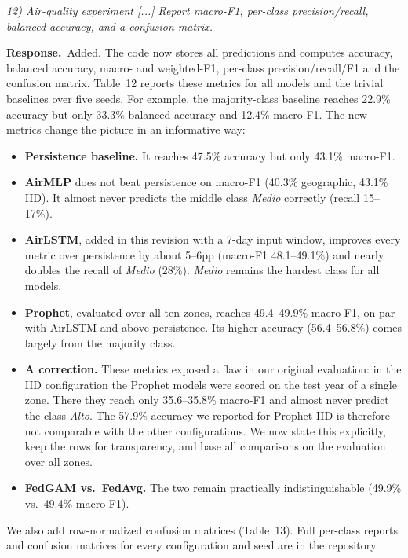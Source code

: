 \documentclass[11pt,a4paper]{article}
\newenvironment{comment}{\par\medskip\noindent\begin{minipage}{\linewidth}\color{blue!45!black}\itshape}{\end{minipage}\par}
\newcommand{\reply}{\par\smallskip\noindent\textbf{Response.}~}
\begin{document}
\begin{comment}
12) Air-quality experiment [...] Report macro-F1, per-class precision/recall, balanced accuracy, and a confusion matrix.
\end{comment}
\reply Added. The code now stores all predictions and computes accuracy, balanced accuracy, macro- and weighted-F1, per-class precision/recall/F1 and the confusion matrix. Table~12 reports these metrics for all models and the trivial baselines over five seeds. For example, the majority-class baseline reaches 22.9\% accuracy but only 33.3\% balanced accuracy and 12.4\% macro-F1. The new metrics change the picture in an informative way:
\begin{itemize}[leftmargin=1.3em,itemsep=0.1em]
\item \textbf{Persistence baseline.} It reaches 47.5\% accuracy but only 43.1\% macro-F1.
\item \textbf{AirMLP} does not beat persistence on macro-F1 (40.3\% geographic, 43.1\% IID). It almost never predicts the middle class \textit{Medio} correctly (recall 15--17\%).
\item \textbf{AirLSTM}, added in this revision with a 7-day input window, improves every metric over persistence by about 5--6pp (macro-F1 48.1--49.1\%) and nearly doubles the recall of \textit{Medio} (28\%). \textit{Medio} remains the hardest class for all models.
\item \textbf{Prophet}, evaluated over all ten zones, reaches 49.4--49.9\% macro-F1, on par with AirLSTM and above persistence. Its higher accuracy (56.4--56.8\%) comes largely from the majority class.
\item \textbf{A correction.} These metrics exposed a flaw in our original evaluation: in the IID configuration the Prophet models were scored on the test year of a single zone. There they reach only 35.6--35.8\% macro-F1 and almost never predict the class \textit{Alto}. The 57.9\% accuracy we reported for Prophet-IID is therefore not comparable with the other configurations. We now state this explicitly, keep the rows for transparency, and base all comparisons on the evaluation over all zones.
\item \textbf{FedGAM vs.\ FedAvg.} The two remain practically indistinguishable (49.9\% vs.\ 49.4\% macro-F1).
\end{itemize}
We also add row-normalized confusion matrices (Table~13). Full per-class reports and confusion matrices for every configuration and seed are in the repository.
\end{document}
